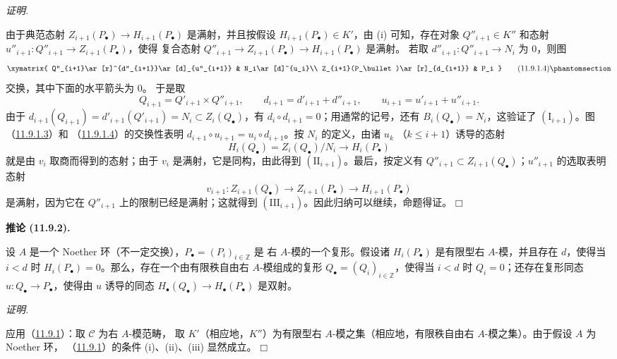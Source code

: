 \documentclass[UTF8,fontset=none,11pt,oneside,openany]{ctexbook}
\providecommand{\square}{\mdlgwhtsquare}
\newenvironment{corollary}[1][]{%
  \par\medskip\noindent\textbf{推论 (#1).}\ %
}{\par}
\newenvironment{proof}{%
  \par\smallskip\noindent\textit{证明.}\ %
}{\hfill$\square$\par}
\newcommand{\oldpage}[2][]{%
  \hypertarget{ega-source-page-#1-#2}{}%
  \marginnote{\scriptsize\textbf{#1}~|~#2}\ignorespaces}
\let\EGAOriginalLabel\label
\renewcommand{\label}[1]{\phantomsection\EGAOriginalLabel{#1}}
\begin{document}
\begin{proof}
由于典范态射 $Z_{i+1}(P_\bullet)\to H_{i+1}(P_\bullet)$ 是满射，并且按假设
$H_{i+1}(P_\bullet)\in K'$，由 (i) 可知，存在对象
$Q''_{i+1}\in K''$ 和态射 $u''_{i+1}:Q''_{i+1}\to Z_{i+1}(P_\bullet)$，使得
复合态射 $Q''_{i+1}\to Z_{i+1}(P_\bullet)\to H_{i+1}(P_\bullet)$ 是满射。
若取 $d''_{i+1}:Q''_{i+1}\to N_i$ 为 $0$，则图
\[
\xymatrix{
Q''_{i+1}\ar[r]^{d''_{i+1}}\ar[d]_{u''_{i+1}} &
N_i\ar[d]^{u_i}\\
Z_{i+1}(P_\bullet)\ar[r]_{d_{i+1}} & P_i
}
\tag{11.9.1.4}\label{0.11.9.1.4-fr}
\]
交换，其中下面的水平箭头为 $0$。
\oldpage[0\textsubscript{III}]{48}
于是取
\[
Q_{i+1}=Q'_{i+1}\times Q''_{i+1},\qquad
d_{i+1}=d'_{i+1}+d''_{i+1},\qquad
u_{i+1}=u'_{i+1}+u''_{i+1}.
\]
由于 $d_{i+1}(Q_{i+1})=d'_{i+1}(Q'_{i+1})=N_i\subset Z_i(Q_\bullet)$，有
$d_i\circ d_{i+1}=0$；用通常的记号，还有 $B_i(Q_\bullet)=N_i$，这验证了
$(\mathrm I_{i+1})$。图（\hyperref[0.11.9.1.3-fr]{11.9.1.3}）和
（\hyperref[0.11.9.1.4-fr]{11.9.1.4}）的交换性表明
$d_{i+1}\circ u_{i+1}=u_i\circ d_{i+1}$。按 $N_i$ 的定义，由诸 $u_k$
（$k\leq i+1$）诱导的态射
\[
H_i(Q_\bullet)=Z_i(Q_\bullet)/N_i\longrightarrow H_i(P_\bullet)
\]
就是由 $v_i$ 取商而得到的态射；由于 $v_i$ 是满射，它是同构，由此得到
$(\mathrm{II}_{i+1})$。最后，按定义有
$Q''_{i+1}\subset Z_{i+1}(Q_\bullet)$；$u''_{i+1}$ 的选取表明态射
\[
v_{i+1}:Z_{i+1}(Q_\bullet)\longrightarrow Z_{i+1}(P_\bullet)
\longrightarrow H_{i+1}(P_\bullet)
\]
是满射，因为它在 $Q''_{i+1}$ 上的限制已经是满射；这就得到
$(\mathrm{III}_{i+1})$。因此归纳可以继续，命题得证。
\end{proof}

\begin{corollary}[11.9.2]
\label{0.11.9.2-fr}
设 $A$ 是一个 Noether 环（不一定交换），$P_\bullet=(P_i)_{i\in\mathbb Z}$ 是
右 $A$-模的一个复形。假设诸 $H_i(P_\bullet)$ 是有限型右 $A$-模，并且存在
$d$，使得当 $i<d$ 时 $H_i(P_\bullet)=0$。那么，存在一个由有限秩自由右
$A$-模组成的复形 $Q_\bullet=(Q_i)_{i\in\mathbb Z}$，使得当 $i<d$ 时
$Q_i=0$；还存在复形同态 $u:Q_\bullet\to P_\bullet$，使得由 $u$ 诱导的同态
$H_\bullet(Q_\bullet)\to H_\bullet(P_\bullet)$ 是双射。
\end{corollary}

\begin{proof}
应用（\hyperref[0.11.9.1-fr]{11.9.1}）：取 $\mathcal C$ 为右 $A$-模范畴，
取 $K'$（相应地，$K''$）为有限型右 $A$-模之集（相应地，有限秩自由右
$A$-模之集）。由于假设 $A$ 为 Noether 环，
（\hyperref[0.11.9.1-fr]{11.9.1}）的条件 (i)、(ii)、(iii) 显然成立。
\end{proof}
\end{document}
